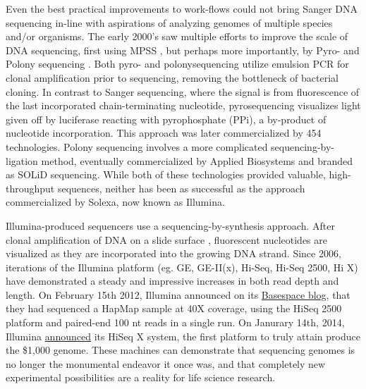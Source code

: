 Even the best practical improvements to work-flows could not bring Sanger DNA sequencing in-line with aspirations of analyzing genomes of multiple species and/or organisms. The early 2000’s saw multiple efforts to improve the scale of DNA sequencing, first using MPSS \citep{Brenner2000a}, but perhaps more importantly, by Pyro- \citep{Ronaghi1998a} and Polony sequencing \citep{Shendure2005}. Both pyro- and polonysequencing utilize emulsion PCR \citep{Nakano2003a} for clonal amplification prior to sequencing, removing the bottleneck of bacterial cloning. In contrast to Sanger sequencing, where the signal is from fluorescence of the last incorporated chain-terminating nucleotide, pyrosequencing visualizes light given off by luciferase reacting with pyrophosphate (PPi), a by-product of nucleotide incorporation. This approach was later commercialized by 454 technologies. Polony sequencing involves a more complicated sequencing-by-ligation method, eventually commercialized by Applied Biosystems and branded as SOLiD sequencing. While both of these technologies provided valuable, high-throughput sequences, neither has been as successful as the approach commercialized by Solexa, now known as Illumina.

Illumina-produced sequencers use a sequencing-by-synthesis approach. After clonal amplification of DNA on a slide surface \citep{Bentley2008}, fluorescent nucleotides are visualized as they are incorporated into the growing DNA strand. Since 2006, iterations of the Illumina platform (eg. GE, GE-II(x), Hi-Seq, Hi-Seq 2500, Hi X) have demonstrated a steady and impressive increases in both read depth and length. On February 15th 2012, Illumina announced on its \href{http://blog.basespace.illumina.com/}{Basespace blog}, that they had sequenced a HapMap sample at 40X coverage, using the HiSeq 2500 platform and paired-end 100 nt reads in a single run. On Janurary 14th, 2014, Illumina \href{http://bit.ly/PZpegZ}{announced} its HiSeq X system, the first platform to truly attain produce the \$1,000 genome. These machines can demonstrate that sequencing genomes is no longer the monumental endeavor it once was, and that completely new experimental possibilities are a reality for life science research.

